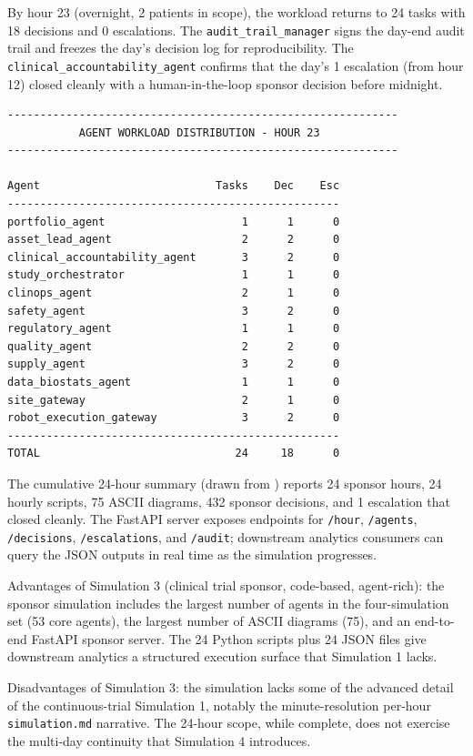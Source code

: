 By hour 23 (overnight, 2 patients in scope), the workload returns to
24 tasks with 18 decisions and 0 escalations. The
\texttt{audit\_trail\_manager} signs the day-end audit trail and
freezes the day's decision log for reproducibility. The
\texttt{clinical\_accountability\_agent} confirms that the day's 1
escalation (from hour 12) closed cleanly with a human-in-the-loop
sponsor decision before midnight.

\begin{verbatim}
------------------------------------------------------------
           AGENT WORKLOAD DISTRIBUTION - HOUR 23
------------------------------------------------------------

Agent                           Tasks    Dec    Esc
---------------------------------------------------
portfolio_agent                     1      1      0
asset_lead_agent                    2      2      0
clinical_accountability_agent       3      2      0
study_orchestrator                  1      1      0
clinops_agent                       2      1      0
safety_agent                        3      2      0
regulatory_agent                    1      1      0
quality_agent                       2      2      0
supply_agent                        3      2      0
data_biostats_agent                 1      1      0
site_gateway                        2      1      0
robot_execution_gateway             3      2      0
---------------------------------------------------
TOTAL                              24     18      0
\end{verbatim}

The cumulative 24-hour summary (drawn from
) reports 24 sponsor hours, 24 hourly
scripts, 75 ASCII diagrams, 432 sponsor decisions, and 1 escalation
that closed cleanly. The FastAPI server exposes endpoints for
\texttt{/hour}, \texttt{/agents}, \texttt{/decisions},
\texttt{/escalations}, and \texttt{/audit}; downstream analytics
consumers can query the JSON outputs in real time as the simulation
progresses.

Advantages of Simulation 3 (clinical trial sponsor, code-based,
agent-rich): the sponsor simulation includes the largest number of
agents in the four-simulation set (53 core agents), the largest number
of ASCII diagrams (75), and an end-to-end FastAPI sponsor server. The
24 Python scripts plus 24 JSON files give downstream analytics a
structured execution surface that Simulation 1 lacks.

Disadvantages of Simulation 3: the simulation lacks some of the
advanced detail of the continuous-trial Simulation 1, notably the
minute-resolution per-hour \texttt{simulation.md} narrative. The
24-hour scope, while complete, does not exercise the multi-day
continuity that Simulation 4 introduces.

